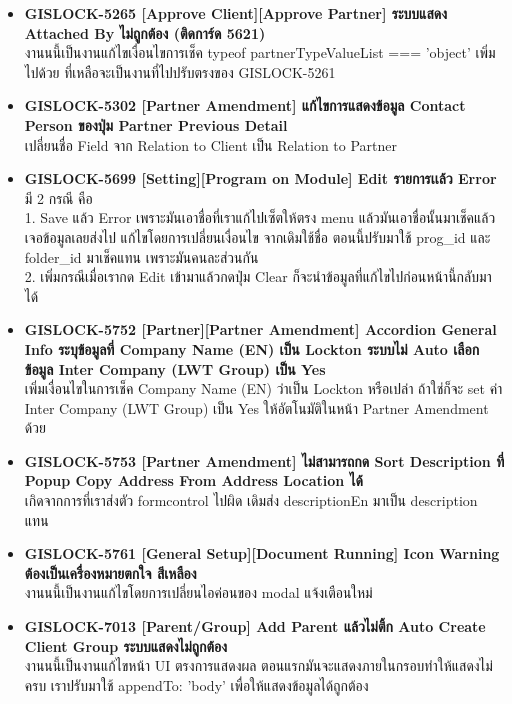 \begin{itemize}
    \item \textbf{{GISLOCK-5265 [Approve Client][Approve Partner] ระบบแสดง Attached By ไม่ถูกต้อง (ติดการ์ด 5621)}} \\
          งานนนี้เป็นงานแก้ไขเงื่อนไขการเช็ค typeof partnerTypeValueList === 'object' เพิ่มไปด้วย ที่เหลือจะเป็นงานที่ไปปรับตรงของ GISLOCK-5261 
    \item \textbf{{GISLOCK-5302 [Partner Amendment] แก้ไขการแสดงข้อมูล Contact Person ของปุ่ม Partner Previous Detail}} \\
          เปลี่ยนชื่อ Field จาก Relation to Client เป็น Relation to Partner
    \item \textbf{{GISLOCK-5699 [Setting][Program on Module] Edit รายการเเล้ว Error}} \\
          มี 2 กรณี คือ \\
          1. Save แล้ว Error เพราะมันเอาชื่อที่เราแก้ไปเซ็ตให้ตรง menu แล้วมันเอาชื่อนั้นมาเช็คแล้วเจอข้อมูลเลยส่งไป แก้ไขโดยการเปลี่ยนเงื่อนไข จากเดิมใช้ชื่อ ตอนนี้ปรับมาใช้ prog\_id และ folder\_id มาเช็คแทน เพราะมันคนละส่วนกัน \\ 
          2. เพิ่มกรณีเมื่อเรากด Edit เข้ามาแล้วกดปุ่ม Clear ก็จะนำข้อมูลที่แก้ไขไปก่อนหน้านี้กลับมาได้
    \item \textbf{{GISLOCK-5752 [Partner][Partner Amendment] Accordion General Info ระบุข้อมูลที่ Company Name (EN) เป็น Lockton ระบบไม่ Auto เลือกข้อมูล Inter Company (LWT Group) เป็น Yes}} \\
          เพิ่มเงื่อนไขในการเช็ค Company Name (EN) ว่าเป็น Lockton หรือเปล่า ถ้าใช่ก็จะ set ค่า Inter Company (LWT Group) เป็น Yes ให้อัตโนมัติในหน้า Partner Amendment ด้วย
    \item \textbf{{GISLOCK-5753 [Partner Amendment] ไม่สามารถกด Sort Description ที่ Popup Copy Address From Address Location ได้}} \\
          เกิดจากการที่เราส่งตัว formcontrol ไปผิด เดิมส่ง descriptionEn มาเป็น description แทน
    \item \textbf{{GISLOCK-5761 [General Setup][Document Running] Icon Warning ต้องเป็นเครื่องหมายตกใจ สีเหลือง}} \\
          งานนนี้เป็นงานแก้ไขโดยการเปลี่ยนไอค่อนของ modal แจ้งเตือนใหม่
    \item \textbf{{GISLOCK-7013 [Parent/Group] Add Parent แล้วไม่ติ้ก Auto Create Client Group ระบบแสดงไม่ถูกต้อง}} \\
          งานนนี้เป็นงานแก้ไขหน้า UI ตรงการแสดงผล ตอนแรกมันจะแสดงภายในกรอบทำให้แสดงไม่ครบ เราปรับมาใช้ appendTo: 'body' เพื่อให้แสดงข้อมูลได้ถูกต้อง

\end{itemize}
